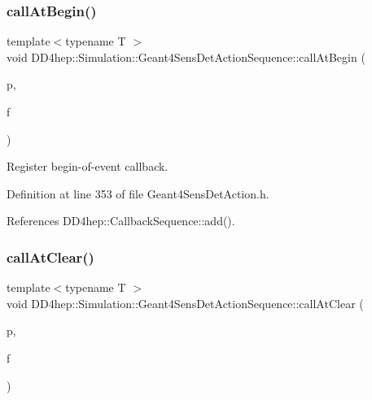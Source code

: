 \hypertarget{class_d_d4hep_1_1_simulation_1_1_geant4_sens_det_action_sequence_a45cf860e819a71b04572873736f809bb}{}\label{class_d_d4hep_1_1_simulation_1_1_geant4_sens_det_action_sequence_a45cf860e819a71b04572873736f809bb} 
\subsubsection{\texorpdfstring{call\+At\+Begin()}{callAtBegin()}}
{\footnotesize\ttfamily template$<$typename T $>$ \\
void D\+D4hep\+::\+Simulation\+::\+Geant4\+Sens\+Det\+Action\+Sequence\+::call\+At\+Begin (\begin{DoxyParamCaption}\item[{\hyperlink{class_t}{T} $\ast$}]{p,  }\item[{void(T\+::$\ast$)(G4\+H\+Cof\+This\+Event $\ast$)}]{f }\end{DoxyParamCaption})\hspace{0.3cm}{\ttfamily [inline]}}



Register begin-\/of-\/event callback. 



Definition at line 353 of file Geant4\+Sens\+Det\+Action.\+h.



References D\+D4hep\+::\+Callback\+Sequence\+::add().

\hypertarget{class_d_d4hep_1_1_simulation_1_1_geant4_sens_det_action_sequence_a33ec5e2e883d0b8e1fa1ed7fe564ccbb}{}\label{class_d_d4hep_1_1_simulation_1_1_geant4_sens_det_action_sequence_a33ec5e2e883d0b8e1fa1ed7fe564ccbb} 
\subsubsection{\texorpdfstring{call\+At\+Clear()}{callAtClear()}}
{\footnotesize\ttfamily template$<$typename T $>$ \\
void D\+D4hep\+::\+Simulation\+::\+Geant4\+Sens\+Det\+Action\+Sequence\+::call\+At\+Clear (\begin{DoxyParamCaption}\item[{\hyperlink{class_t}{T} $\ast$}]{p,  }\item[{void(T\+::$\ast$)(G4\+H\+Cof\+This\+Event $\ast$)}]{f }\end{DoxyParamCaption})\hspace{0.3cm}{\ttfamily [inline]}}



